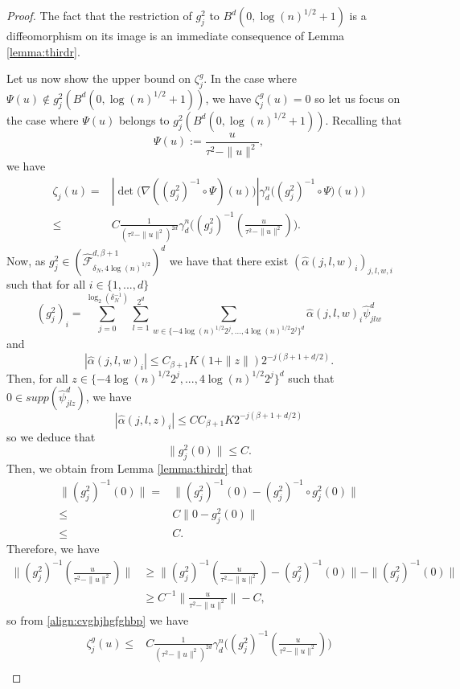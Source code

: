 \documentclass[10pt]{article}
\begin{document}
\begin{proof}
The fact that the restriction of $g_j^2$ to $B^d(0,\log(n)^{1/2}+1)$ is a diffeomorphism on its image is an immediate consequence of Lemma \ref{lemma:thirdr}. 

Let us now show the upper bound on $\zeta_j^g$. In the case where $\Psi(u)\notin g_j^2(B^d(0,\log(n)^{1/2}+1))$, we have $\zeta_j^g(u)=0$ so let us focus on the case where $\Psi(u)$ belongs to $g_j^2(B^d(0,\log(n)^{1/2}+1))$. Recalling that
$$\Psi(u):= \frac{u}{\tau^2-\|u\|^2},$$
we have
\begin{align}\label{align:cvghjhgfghbp}
    \zeta_j (u)=&|\det\big(\nabla( (g_j^2)^{-1}\circ \Psi) (u)\big)|\gamma_d^n\big((g_j^2)^{-1}\circ \Psi) (u)\big)\nonumber\\
    \leq & C\frac{1}{(\tau^2-\|u\|^2)^{2d}} \gamma_d^n\big((g_j^2)^{-1} (\frac{u}{\tau^2-\|u\|^2})\big).
\end{align}
Now, as $g_j^{2}\in \left(\hat{\mathcal{F}}_{\delta_N,4\log(n)^{1/2}}^{d,\beta+1}\right)^{d}$ we have that there exist $(\hat{\alpha}(j,l,w)_i)_{j,l,w,i}$ such that for all $i\in \{1,...,d\}$
$$(g_j^2)_i=\sum \limits_{j=0}^{\log_2(\delta_N^{-1})} \sum \limits_{l=1}^{2^d} \sum \limits_{w\in \{-4\log(n)^{1/2}2^j,...,4\log(n)^{1/2}2^j\}^d} \hat{\alpha}(j,l,w)_i \hat{\psi}^d_{jlw}$$
and
$$|\hat{\alpha}(j,l,w)_i|\leq C_{\beta+1} K(1+\|z\|)2^{-j(\beta+1+d/2)}.$$
Then, for all $z\in \{-4\log(n)^{1/2}2^j,...,4\log(n)^{1/2}2^j\}^d$ such that $0 \in supp(\hat{\psi}^d_{jlz})$, we have
$$|\hat{\alpha}(j,l,z)_i|\leq CC_{\beta+1} K2^{-j(\beta+1+d/2)}$$
so we deduce that
$$\|g_j^2(0)\|\leq C.$$
Then, we obtain from Lemma  \ref{lemma:thirdr} that
\begin{align*}
    \|(g_j^2)^{-1} (0)\|=&\|(g_j^2)^{-1} (0)-(g_j^2)^{-1}\circ g_j^2 (0)\|\\
    \leq & C\|0-g_j^2 (0)\|\\
    \leq & C.
\end{align*}
Therefore, we have
\begin{align}\label{align:bvghnbghjklsop}
    \|(g_j^2)^{-1} (\frac{u}{\tau^2-\|u\|^2})\|&\geq \|(g_j^2)^{-1} (\frac{u}{\tau^2-\|u\|^2})-(g_j^2)^{-1} (0)\|-\|(g_j^2)^{-1} (0)\|\nonumber\\
    &\geq C^{-1}\|\frac{u}{\tau^2-\|u\|^2}\|-C,
\end{align}
so from \eqref{align:cvghjhgfghbp} we have
\begin{align*}
        \zeta_j^g (u)
    \leq & C\frac{1}{(\tau^2-\|u\|^2)^{2d}} \gamma_d^n\big((g_j^2)^{-1} (\frac{u}{\tau^2-\|u\|^2})\big)\\

\end{align*}
\end{proof}
\end{document}
